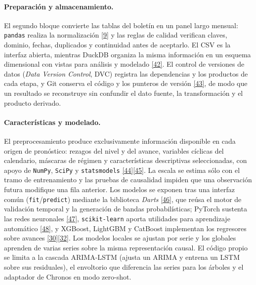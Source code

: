 \documentclass[12pt,letterpaper]{report}
\newcommand{\cita}[1]{\hyperref[bib:#1]{[#1]}}
\begin{document}
\paragraph{Preparación y almacenamiento.} El segundo bloque convierte las tablas del boletín en
un panel largo mensual: \texttt{pandas} realiza la normalización \cita{9} y las reglas de
calidad verifican claves, dominio, fechas, duplicados y continuidad antes de aceptarlo. El CSV
es la interfaz abierta, mientras DuckDB organiza la misma información en un esquema dimensional
con vistas para análisis y modelado \cita{42}. El control de versiones de datos (\textit{Data Version Control}, DVC) registra las
dependencias y los productos de
cada etapa, y Git conserva el código y los punteros de versión \cita{43}, de modo que un
resultado se reconstruye sin confundir el dato fuente, la transformación y el producto derivado.

\paragraph{Características y modelado.} El preprocesamiento produce exclusivamente información
disponible en cada origen de pronóstico: rezagos del nivel y del avance, variables cíclicas del
calendario, máscaras de régimen y características descriptivas seleccionadas, con apoyo de
\texttt{NumPy}, \texttt{SciPy} y \texttt{statsmodels} \cita{44}\cita{45}. La escala se estima
sólo con el tramo de entrenamiento y las pruebas de causalidad impiden que una observación
futura modifique una fila anterior. Los \factNModels{} modelos se exponen tras una interfaz
común (\texttt{fit}/\texttt{predict}) mediante la biblioteca \textit{Darts} \cita{46}, que
reúsa el motor de validación temporal y la generación de bandas probabilísticas; PyTorch
sustenta las redes neuronales \cita{47}, \texttt{scikit-learn} aporta utilidades para
aprendizaje automático \cita{48}, y XGBoost, LightGBM y CatBoost implementan los regresores
sobre avances \cita{30}\textendash\cita{32}. Los modelos locales se ajustan por serie y los
globales aprenden de varias series sobre la misma representación causal. El código propio se
limita a la cascada ARIMA-LSTM (ajusta un ARIMA y entrena un LSTM sobre sus residuales), el
envoltorio que diferencia las series para los árboles y el adaptador de Chronos en modo
zero-shot.
\end{document}
